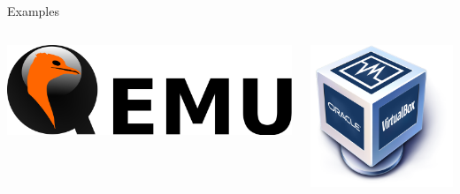 \documentclass[12pt]{beamer}
\begin{document}
\begin{frame}{Examples}
\begin{columns}
  \end{columns}
  \begin{columns}
    \begin{column}{0.5\linewidth}
      \includegraphics[width=\linewidth]{qemu}
    \end{column}
    \begin{column}{0.5\linewidth}
      \begin{center}
        \includegraphics[width=0.7\linewidth]{virtualbox}
      \end{center}
    \end{column}
  \end{columns}
\end{frame}
\end{document}
